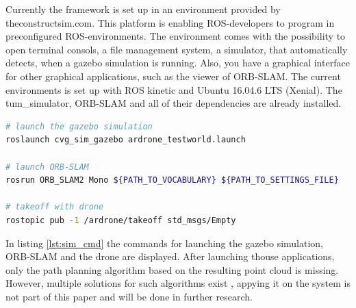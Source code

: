 	Currently the framework is set up in an environment provided by theconstructsim.com. This platform is enabling ROS-developers to program in preconfigured
	ROS-environments. The environment comes with the possibility to open terminal consols, a file management system, a simulator, that automatically 
	detects, when a gazebo simulation is running. Also, you have a graphical interface for other graphical applications, such as the viewer of ORB-SLAM.
	The current environments is set up with ROS kinetic and Ubuntu 16.04.6 LTS (Xenial). The tum\_simulator, ORB-SLAM and all of their dependencies are already installed. 
	
	\begin{lstlisting}[language=bash, caption=Launching the simulated environment, label=lst:sim_cmd]
# launch the gazebo simulation
roslaunch cvg_sim_gazebo ardrone_testworld.launch
	
# launch ORB-SLAM
rosrun ORB_SLAM2 Mono ${PATH_TO_VOCABULARY} ${PATH_TO_SETTINGS_FILE}
	
# takeoff with drone 
rostopic pub -1 /ardrone/takeoff std_msgs/Empty
	\end{lstlisting}
	
	In listing \ref{lst:sim_cmd} the commands for launching the gazebo simulation, ORB-SLAM and the drone are displayed. After launching thouse 
	applications, only the path planning algorithm based on the resulting point cloud is missing. However, multiple solutions for such algorithms 
	exist \cite{path}, appying it on the system is not part of this paper and will be done in further research. 